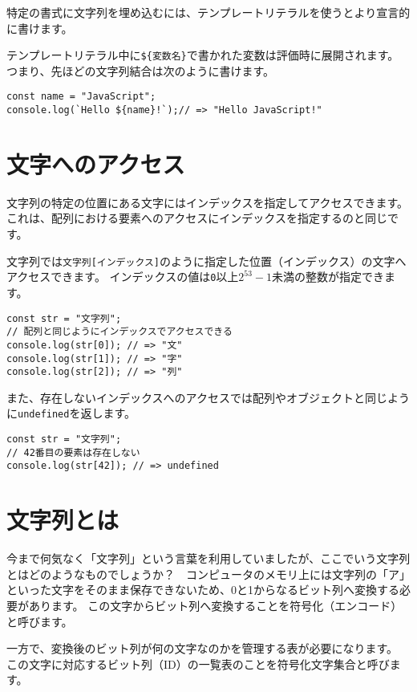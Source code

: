 特定の書式に文字列を埋め込むには、テンプレートリテラルを使うとより宣言的に書けます。

テンプレートリテラル中に\texttt{\$\{変数名\}}で書かれた変数は評価時に展開されます。
つまり、先ほどの文字列結合は次のように書けます。

\begin{lstlisting}
const name = "JavaScript";
console.log(`Hello ${name}!`);// => "Hello JavaScript!"
\end{lstlisting}

\hypertarget{get-char}{%
\section{文字へのアクセス}\label{get-char}}

文字列の特定の位置にある文字にはインデックスを指定してアクセスできます。
これは、配列における要素へのアクセスにインデックスを指定するのと同じです。

文字列では\texttt{文字列[インデックス]}のように指定した位置（インデックス）の文字へアクセスできます。
インデックスの値は\texttt{0}以上\texttt{$2^{53} - 1$}未満の整数が指定できます。

\begin{lstlisting}
const str = "文字列";
// 配列と同じようにインデックスでアクセスできる
console.log(str[0]); // => "文"
console.log(str[1]); // => "字"
console.log(str[2]); // => "列"
\end{lstlisting}

また、存在しないインデックスへのアクセスでは配列やオブジェクトと同じように\texttt{undefined}を返します。

\begin{lstlisting}
const str = "文字列";
// 42番目の要素は存在しない
console.log(str[42]); // => undefined
\end{lstlisting}

\hypertarget{what-is-string}{%
\section{文字列とは}\label{what-is-string}}

今まで何気なく「文字列」という言葉を利用していましたが、ここでいう文字列とはどのようなものでしょうか？　コンピュータのメモリ上には文字列の「ア」といった文字をそのまま保存できないため、0と1からなるビット列へ変換する必要があります。
この文字からビット列へ変換することを符号化（エンコード）と呼びます。

一方で、変換後のビット列が何の文字なのかを管理する表が必要になります。
この文字に対応するビット列（ID）の一覧表のことを符号化文字集合と呼びます。

